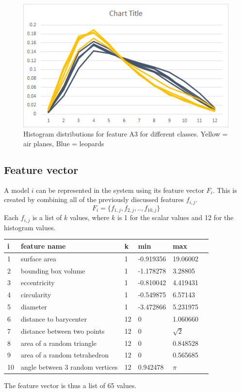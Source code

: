 \documentclass{bigdata}
\begin{document}
\begin{figure}[h!]
    \includegraphics[width=\linewidth]{Pictures/Part3/A3.png}
    \caption{Histogram distributions for feature A3 for different classes. Yellow = air planes, Blue = leopards}
  \label{fig:eccentricity}
\end{figure}

\subsection{Feature vector}
A model $i$ can be represented in the system using its feature vector $F_i$. This is created by combining all of the previously discussed features $f_{i,j}$.
\begin{equation}
F_i = \{f_{1,j}, f_{2,j}, .. , f_{10,j}\}
\end{equation}
Each $f_{i,j}$ is a list of $k$ values, where $k$ is 1 for the scalar values and 12 for the histogram values.

\begin{center}
\begin{tabular}
{ l | l | l | l | l | l}
i & feature name & k & min & max\\ \hline
1 & surface area & 1 & -0.919356 & 19.06002 \\
2 & bounding box volume & 1 & -1.178278 & 3.28805\\
3 & eccentricity & 1 & -0.810042 & 4.419431\\
4 & circularity & 1 & -0.549875 & 6.57143\\
5 & diameter & 1 & -3.472866 & 5.231975\\
6 & distance to barycenter & 12 & 0 & 1.060660\\
7 & distance between two points & 12 & 0 & $\sqrt{2}$\\
8 & area of a random triangle & 12 & 0 & 0.848528 \\
9 & area of a random tetrahedron & 12 & 0 & 0.565685\\
10 & angle between 3 random vertices & 12 & 0.942478 & $\pi$\\
\end{tabular}
\end{center}
The feature vector is thus a list of 65 values.
\end{document}
